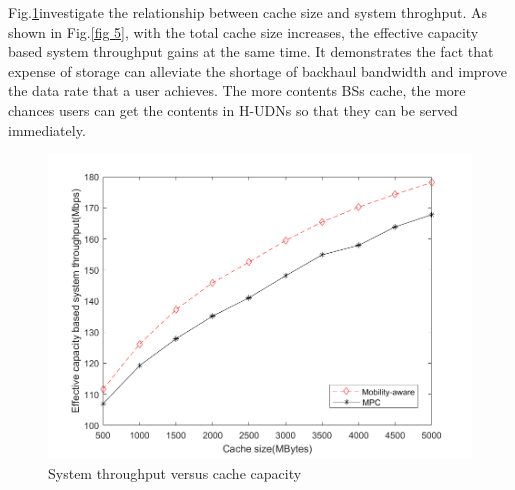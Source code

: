 \documentclass[conference]{IEEEtran}
\begin{document}
Fig.\ref{fig 4}investigate the relationship between cache size and system throghput. As shown in Fig.\ref{fig 5}, with the total cache size increases, the effective capacity based system throughput gains at the same time. It demonstrates the fact that expense of storage can alleviate the shortage of backhaul bandwidth and improve the data rate that a user achieves. The more contents BSs cache, the more chances users can get the contents in H-UDNs so that they can be served immediately.
\begin{figure}[htbp]
 \centerline{\includegraphics[scale=0.3]{fig4.png}}
 \caption{System throughput versus cache capacity}
 \label{fig 4}
\end{figure}
\end{document}
